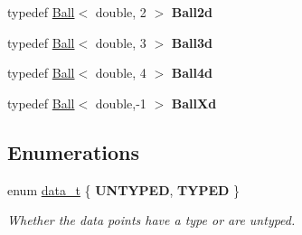 \begin{DoxyCompactItemize}
\item 
\hypertarget{namespace_d_r_d_s_p_a6e23b7d5c8d0e4dd79b0a0e95eda2b64}{typedef \hyperlink{struct_d_r_d_s_p_1_1_ball}{Ball}$<$ double, 2 $>$ {\bfseries Ball2d}}\label{namespace_d_r_d_s_p_a6e23b7d5c8d0e4dd79b0a0e95eda2b64}

\item 
\hypertarget{namespace_d_r_d_s_p_a7918ec01af1fb7e36ca1e88d0e62df3b}{typedef \hyperlink{struct_d_r_d_s_p_1_1_ball}{Ball}$<$ double, 3 $>$ {\bfseries Ball3d}}\label{namespace_d_r_d_s_p_a7918ec01af1fb7e36ca1e88d0e62df3b}

\item 
\hypertarget{namespace_d_r_d_s_p_aea2323a573269119216cf44d0a4b11a5}{typedef \hyperlink{struct_d_r_d_s_p_1_1_ball}{Ball}$<$ double, 4 $>$ {\bfseries Ball4d}}\label{namespace_d_r_d_s_p_aea2323a573269119216cf44d0a4b11a5}

\item 
\hypertarget{namespace_d_r_d_s_p_a1a5909555c6c6f91fdc3fb2749cbcf8f}{typedef \hyperlink{struct_d_r_d_s_p_1_1_ball}{Ball}$<$ double,-\/1 $>$ {\bfseries Ball\-Xd}}\label{namespace_d_r_d_s_p_a1a5909555c6c6f91fdc3fb2749cbcf8f}

\end{DoxyCompactItemize}
\subsection*{Enumerations}
\begin{DoxyCompactItemize}
\item 
enum \hyperlink{namespace_d_r_d_s_p_ab6a478b9bf6edcbb04a75a9112934747}{data\-\_\-t} \{ {\bfseries U\-N\-T\-Y\-P\-E\-D}, 
{\bfseries T\-Y\-P\-E\-D}
 \}
\begin{DoxyCompactList}\small\item\em Whether the data points have a type or are untyped. \end{DoxyCompactList}\end{DoxyCompactItemize}

